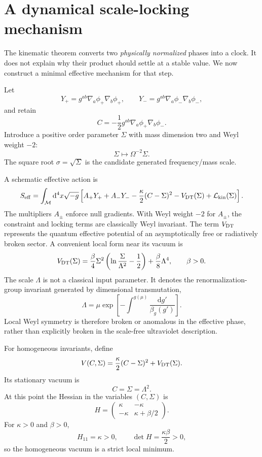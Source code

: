 \documentclass[11pt,a4paper]{article}
\newcommand{\M}{\mathcal{M}}
\newcommand{\dd}{\mathrm{d}}
\newcommand{\Ccross}{C}
\newcommand{\Lag}{\mathcal{L}}
\begin{document}
\section{A dynamical scale-locking mechanism}

The kinematic theorem converts two \emph{physically normalized} phases into a clock. It does not explain why their product should settle at a stable value. We now construct a minimal effective mechanism for that step.

Let
\[
Y_+=g^{ab}\nabla_a\phi_+\nabla_b\phi_+,
\qquad
Y_-=g^{ab}\nabla_a\phi_-\nabla_b\phi_-,
\]
and retain
\[
\Ccross=-\frac12g^{ab}\nabla_a\phi_+\nabla_b\phi_-.
\]
Introduce a positive order parameter $\Sigma$ with mass dimension two and Weyl weight $-2$:
\[
\Sigma\mapsto\Omega^{-2}\Sigma.
\]
The square root $\sigma=\sqrt\Sigma$ is the candidate generated frequency/mass scale.

A schematic effective action is
\begin{equation}
S_{\rm eff}=\int_{\M}\dd^4x\sqrt{-g}\left[
A_+Y_+ + A_-Y_-
-\frac{\kappa}{2}(\Ccross-\Sigma)^2
-V_{\rm DT}(\Sigma)
+\Lag_{\rm kin}(\Sigma)
\right].
\label{eq:Seff}
\end{equation}
The multipliers $A_\pm$ enforce null gradients. With Weyl weight $-2$ for $A_\pm$, the constraint and locking terms are classically Weyl invariant. The term $V_{\rm DT}$ represents the quantum effective potential of an asymptotically free or radiatively broken sector. A convenient local form near its vacuum is
\begin{equation}
V_{\rm DT}(\Sigma)=
\frac{\beta}{4}\Sigma^2
\left(\ln\frac{\Sigma}{\Lambda^2}-\frac12\right)
+\frac{\beta}{8}\Lambda^4,
\qquad \beta>0.
\label{eq:VDT}
\end{equation}
The scale $\Lambda$ is not a classical input parameter. It denotes the renormalization-group invariant generated by dimensional transmutation,
\begin{equation}
\Lambda=\mu\exp\left[-\int^{g(\mu)}\frac{\dd g'}{\beta_g(g')}\right].
\label{eq:RGscale}
\end{equation}
Local Weyl symmetry is therefore broken or anomalous in the effective phase, rather than explicitly broken in the scale-free ultraviolet description.

For homogeneous invariants, define
\begin{equation}
V(\Ccross,\Sigma)=
\frac{\kappa}{2}(\Ccross-\Sigma)^2+V_{\rm DT}(\Sigma).
\label{eq:fullV}
\end{equation}
Its stationary vacuum is
\begin{equation}
\boxed{\Ccross=\Sigma=\Lambda^2.}
\label{eq:vacuum}
\end{equation}
At this point the Hessian in the variables $(\Ccross,\Sigma)$ is
\begin{equation}
H=\begin{pmatrix}
\kappa & -\kappa\\
-\kappa & \kappa+\beta/2
\end{pmatrix}.
\end{equation}
For $\kappa>0$ and $\beta>0$,
\[
H_{11}=\kappa>0,
\qquad
\det H=\frac{\kappa\beta}{2}>0,
\]
so the homogeneous vacuum is a strict local minimum.
\end{document}

